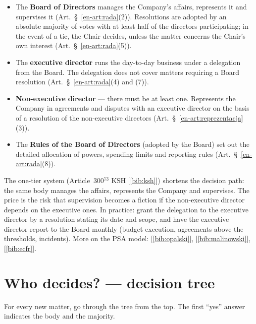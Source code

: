 \documentclass[11pt,a4paper]{report}
\newcommand{\Zr}[1]{[\ref{bib:#1}]}
\begin{document}
\begin{itemize}
  \item The \textbf{Board of Directors} manages the Company's affairs, represents it and supervises it (Art.~\S~\ref{en-art:rada}(2)). Resolutions are adopted by an absolute majority of votes with at least half of the directors participating; in the event of a tie, the Chair decides, unless the matter concerns the Chair's own interest (Art.~\S~\ref{en-art:rada}(5)).
  \item The \textbf{executive director} runs the day-to-day business under a delegation from the Board. The delegation does not cover matters requiring a Board resolution (Art.~\S~\ref{en-art:rada}(4) and (7)).
  \item \textbf{Non-executive director} --- there must be at least one. Represents the Company in agreements and disputes with an executive director on the basis of a resolution of the non-executive directors (Art.~\S~\ref{en-art:reprezentacja}(3)).
  \item The \textbf{Rules of the Board of Directors} (adopted by the Board) set out the detailed allocation of powers, spending limits and reporting rules (Art.~\S~\ref{en-art:rada}(8)).
\end{itemize}

\begin{Komentarz}
The one-tier system (Article~300$^{73}$ KSH \Zr{ksh}) shortens the decision path: the same body manages the affairs, represents the Company and supervises. The price is the risk that supervision becomes a fiction if the non-executive director depends on the executive ones. In practice: grant the delegation to the executive director by a resolution stating its date and scope, and have the executive director report to the Board monthly (budget execution, agreements above the thresholds, incidents). More on the PSA model: \Zr{opalski}, \Zr{malinowski}, \Zr{ecfr}.
\end{Komentarz}

\section{Who decides? --- decision tree}

For every new matter, go through the tree from the top. The first ``yes'' answer indicates the body and the majority.
\end{document}
